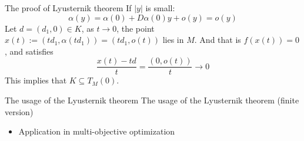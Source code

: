 \begin{frame}{The proof of Lyusternik theorem}
    If $|y|$ is small:
    \begin{equation}
        \alpha(y) = \alpha(0) + D\alpha(0)y + o(y) = o(y)
    \end{equation}
    Let $d = (d_1, 0) \in K$, as $t \rightarrow 0$, the point $x(t) := (td_1, \alpha(td_1)) = (td_1, o(t))$ lies in $M$. And that is $f(x(t)) = 0$, and satisfies 
    \begin{equation}
        \frac{x(t) - td}{t} = \frac{(0, o(t))}{t} \rightarrow 0
    \end{equation}
    This implies that $K \subseteq T_M(0)$.
\end{frame}

\begin{frame}{The usage of the Lyusternik theorem}
    The usage of the Lyusternik theorem (finite version)
    \begin{itemize}
        \item Application in multi-objective optimization \cite{jimenez2002finite}
    \end{itemize}
\end{frame}
